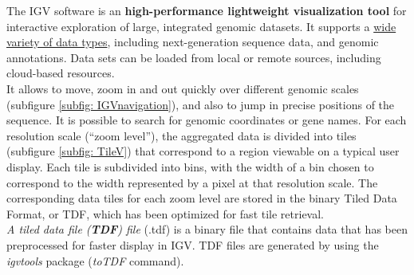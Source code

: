 The IGV software is an \textbf{high-performance lightweight visualization tool}
for interactive exploration of large, integrated genomic datasets. It supports a
\underline{wide variety of data types}, including next-generation sequence data,
and genomic annotations. Data sets can be loaded from local or remote sources,
including cloud-based resources.\\

It allows to move, zoom in and out quickly over different genomic scales
(subfigure \ref*{subfig: IGVnavigation}), and also to jump in precise positions
of the sequence. It is possible to search for genomic coordinates or gene names.
For each resolution scale (“zoom level”), the aggregated data is divided into
tiles (subfigure \ref*{subfig: TileV}) that correspond to a region viewable on a
typical user display. Each tile is subdivided into bins, with the width of a bin
chosen to correspond to the width represented by a pixel at that resolution
scale. The corresponding data tiles for each zoom level are stored in the binary
Tiled Data Format, or TDF, which has been optimized for fast tile retrieval.\\ 
\textit{A tiled data file (\textbf{TDF}) file} (.tdf) is a binary file that
contains data that has been preprocessed for faster display in IGV. TDF files
are generated by using the \textit{igvtools} package (\textit{toTDF} command).\\

